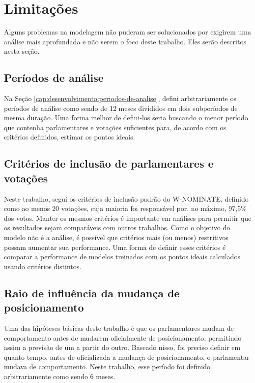 \documentclass[a4paper,titlepage]{ppgi}\usepackage[]{graphicx}\usepackage[]{color}
\begin{document}
\section{Limitações}
\label{cap:conclusao:limitacoes}

Alguns problemas na modelagem não puderam ser solucionados por exigirem uma
análise mais aprofundada e não serem o foco deste trabalho. Eles serão
descritos nesta seção.

\subsection{Períodos de análise}

Na Seção \ref{cap:desenvolvimento:periodos-de-analise}, defini arbitrariamente
os períodos de análise como sendo de 12 meses divididos em dois subperíodos de
mesma duração. Uma forma melhor de defini-los seria buscando o menor período
que contenha parlamentares e votações suficientes para, de acordo com os
critérios definidos, estimar os pontos ideais.

\subsection{Critérios de inclusão de parlamentares e votações}

Neste trabalho, segui os critérios de inclusão padrão do W-NOMINATE, definido
como ao menos 20 votações, cuja maioria foi responsável por, no máximo, 97,5\%
dos votos. Manter os mesmos critérios é importante em análises para permitir
que os resultados sejam comparáveis com outros trabalhos. Como o objetivo do
modelo não é a análise, é possível que critérios mais (ou menos) restritivos
possam aumentar sua performance. Uma forma de definir esses critérios é
comparar a performance de modelos treinados com os pontos ideais calculados
usando critérios distintos.

\subsection{Raio de influência da mudança de posicionamento}

Uma das hipóteses básicas deste trabalho é que os parlamentares mudam de
comportamento antes de mudarem oficialmente de posicionamento, permitindo assim
a previsão de um a partir do outro. Baseado nisso, foi preciso definir em
quanto tempo, antes de oficializada a mudança de posicionamento, o parlamentar
mudava de comportamento. Neste trabalho, esse período foi definido
arbitrariamente como sendo 6 meses.
\end{document}
